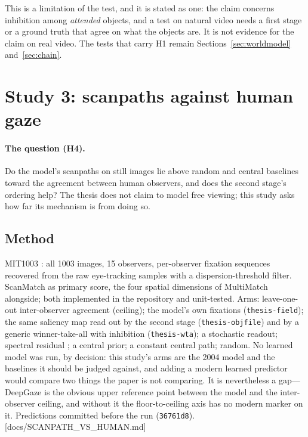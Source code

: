 \documentclass[11pt,a4paper]{article}
\newcommand{\src}[1]{\textcolor{blue!50!black}{\footnotesize\,[#1]}}
\newcommand{\src}[1]{}
\newcommand{\arm}[1]{\texttt{#1}}
\begin{document}
This is a limitation of the test, and it is stated as one: the claim concerns
inhibition among \emph{attended} objects, and a test on natural video needs a
first stage or a ground truth that agree on what the objects are. It is not
evidence for the claim on real video. The tests that carry H1 remain
Sections~\ref{sec:worldmodel} and~\ref{sec:chain}.

\section{Study 3: scanpaths against human gaze}
\label{sec:h4}

\paragraph{The question (H4).} Do the model's scanpaths on still images lie
above random and central baselines toward the agreement between human observers,
and does the second stage's ordering help? The thesis does not claim to model
free viewing; this study asks how far its mechanism is from doing so.

\subsection{Method}
MIT1003 \citep{judd2009}: all 1003 images, 15 observers, per-observer fixation
sequences recovered from the raw eye-tracking samples with a dispersion-threshold
filter. ScanMatch \citep{cristino2010} as primary score, the four spatial
dimensions of MultiMatch \citep{dewhurst2012} alongside; both implemented in the
repository and unit-tested. Arms: leave-one-out inter-observer agreement
(ceiling); the model's own fixations (\arm{thesis-field}); the same saliency map
read out by the second stage (\arm{thesis-objfile}) and by a generic
winner-take-all with inhibition (\arm{thesis-wta}); a stochastic readout; spectral
residual \citep{hou2007}; a central prior; a constant central path; random. No
learned model was run, by decision: this study's arms are the 2004 model and
the baselines it should be judged against, and adding a modern learned
predictor would compare two things the paper is not comparing. It is
nevertheless a gap---DeepGaze \citep{kummerer2016} is the obvious upper
reference point between the model and the inter-observer ceiling, and without it
the floor-to-ceiling axis has no modern marker on it. Predictions
committed before the run (\texttt{36761d8}). \src{docs/SCANPATH\_VS\_HUMAN.md}
\end{document}
